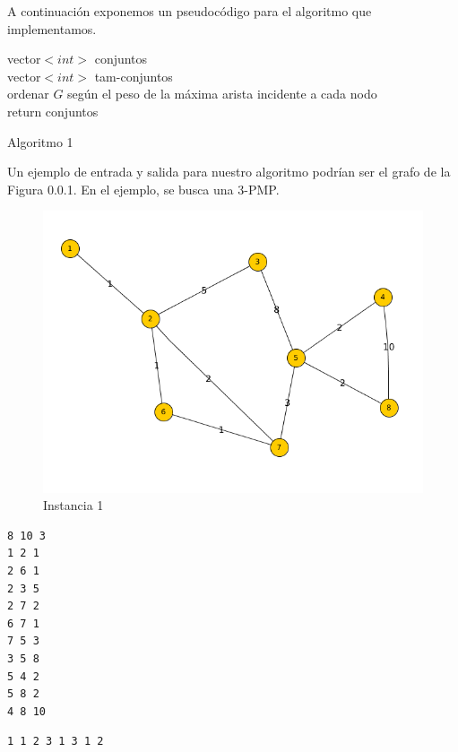 \documentclass[11pt, a4paper, twoside]{article}
\begin{document}
\begin{enumerate}
\begin{enumerate}
		A continuación exponemos un pseudocódigo para el algoritmo que implementamos. \\
		\begin{algorithm}[H]
		  vector$<int>$ conjuntos \\
		  vector$<int>$ tam-conjuntos \\
		  ordenar $G$ según el peso de la máxima arista incidente a cada nodo \\
		  return conjuntos
		\caption{Algoritmo 1}
		\end{algorithm}
		
		Un ejemplo de entrada y salida para nuestro algoritmo podrían ser el grafo de la 
		Figura 0.0.1. En el ejemplo, se busca una 3-PMP.
		
		\begin{figure}[H]
		\includegraphics[scale=1]{imagenes/ej2.png}
		\caption{Instancia 1}
		\end{figure}
		
\begin{minipage}[t]{0.4\textwidth}
\begin{Verbatim}[frame=single,framesep=1cm,label= Ejemplo de entrada: instancia 1]
8 10 3
1 2 1
2 6 1
2 3 5
2 7 2
6 7 1
7 5 3
3 5 8
5 4 2
5 8 2
4 8 10
\end{Verbatim}
\end{minipage}
\hfill
\begin{minipage}[t]{0.4\textwidth}
\begin{Verbatim}[frame=single,framesep=1cm,label= Ejemplo de salida: instancia 1]
1 1 2 3 1 3 1 2
\end{Verbatim}
\end{minipage}
		

\end{enumerate}
\end{enumerate}
\end{document}
